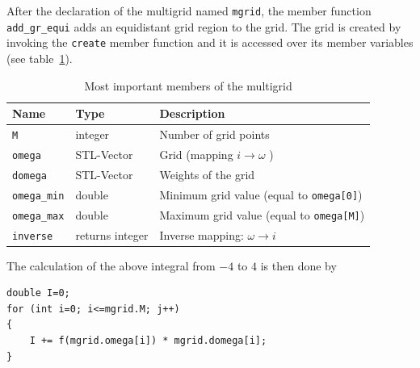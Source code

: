 After the declaration of the multigrid named \texttt{mgrid}, the member function \texttt{add\_gr\_equi} adds an equidistant grid region to the grid. The grid is created by invoking the \texttt{create} member function and it is accessed over its member variables (see table~\ref{tab:member}). 



\begin{table}[h]
	\begin{center}
		\begin{tabular}{l|l|l}\hline
		Name & Type & Description \\ \hline
		\texttt{M} & integer & Number of grid points\\\hline
		\texttt{omega} & STL-Vector & Grid (mapping $i\to\omega$ )\\\hline
		\texttt{domega} & STL-Vector & Weights of the grid\\\hline
		\texttt{omega\_min} & double & Minimum grid value (equal to \texttt{omega[0]}) \\\hline
		\texttt{omega\_max} & double & Maximum grid value (equal to \texttt{omega[M]}) \\\hline
		\texttt{inverse} & returns integer & Inverse mapping: $\omega\to i$ \\\hline
		\end{tabular}
	\end{center}
	\caption{Most important members of the multigrid}
	\label{tab:member}
\end{table}

The calculation of the above integral from $-4$ to $4$ is then done by

\begin{lstlisting}
double I=0;
for (int i=0; i<=mgrid.M; j++)
{
	I += f(mgrid.omega[i]) * mgrid.domega[i];
}
\end{lstlisting}

